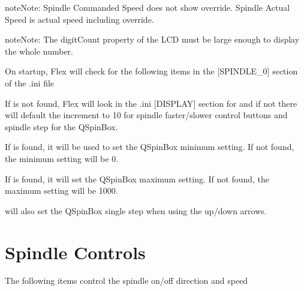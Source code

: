 \documentclass[letterpaper,10pt,english]{sphinxmanual}
\begin{document}
\begin{sphinxadmonition}{note}{Note:}
\sphinxAtStartPar
Spindle Commanded Speed does not show override. Spindle Actual Speed
is actual speed including override.
\end{sphinxadmonition}

\begin{sphinxadmonition}{note}{Note:}
\sphinxAtStartPar
The digitCount property of the LCD must be large enough to display the
whole number.
\end{sphinxadmonition}

\sphinxAtStartPar
On start\sphinxhyphen{}up, Flex will check for the following items in the {[}SPINDLE\_0{]} section
of the .ini file

\sphinxAtStartPar
If  is not found, Flex will look in the .ini {[}DISPLAY{]} section for
 and if not there will default the increment to 10 for
spindle faster/slower control buttons and spindle step for the QSpinBox.

\sphinxAtStartPar
If  is found, it will be used to set the QSpinBox minimum
setting. If not found, the minimum setting will be 0.

\sphinxAtStartPar
If  is found, it will set the QSpinBox maximum setting.
If not found, the maximum setting will be 1000.

\sphinxAtStartPar
{} will also set the QSpinBox single step when using the up/down
arrows.


\section{Spindle Controls}
\label{\detokenize{spindle:spindle-controls}}
\sphinxAtStartPar
The following items control the spindle on/off direction and speed
\end{document}
